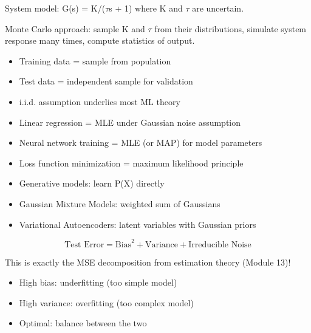 
System model: G(s) = K/(\ensuremath{\tau}s + 1) where K and \ensuremath{\tau} are uncertain.

Monte Carlo approach: sample K and \ensuremath{\tau} from their distributions, simulate system response many times, compute statistics of output.



\begin{itemize}
\tightlist
\item
  Training data = sample from population
\item
  Test data = independent sample for validation
\item
  i.i.d. assumption underlies most ML theory
\end{itemize}


\begin{itemize}
\tightlist
\item
  Linear regression = MLE under Gaussian noise assumption
\item
  Neural network training = MLE (or MAP) for model parameters
\item
  Loss function minimization = maximum likelihood principle
\end{itemize}


\begin{itemize}
\tightlist
\item
  Generative models: learn P(X) directly
\item
  Gaussian Mixture Models: weighted sum of Gaussians
\item
  Variational Autoencoders: latent variables with Gaussian priors
\end{itemize}


\[\text{Test Error} = \text{Bias}^2 + \text{Variance} + \text{Irreducible Noise}\]

This is exactly the MSE decomposition from estimation theory (Module 13)!

\begin{itemize}
\tightlist
\item
  High bias: underfitting (too simple model)
\item
  High variance: overfitting (too complex model)
\item
  Optimal: balance between the two
\end{itemize}

